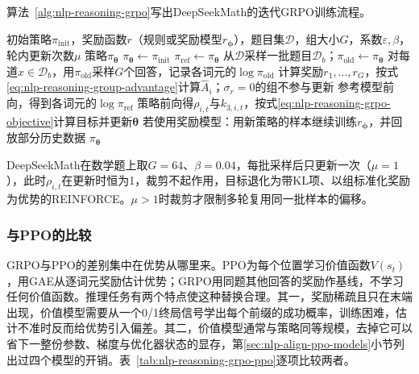 算法~\ref{alg:nlp-reasoning-grpo}写出DeepSeekMath的迭代GRPO训练流程。

\begin{algorithm}[迭代GRPO训练]
  \label{alg:nlp-reasoning-grpo}
  \begin{algorithmic}[1]
    \Require 初始策略$\pi_{\mathrm{init}}$，奖励函数$r$（规则或奖励模型$r_{\bm\phi}$），题目集$\mathcal D$，组大小$G$，系数$\varepsilon,\beta$，轮内更新次数$\mu$
    \Ensure 策略$\pi_{\bm\theta}$
    \State $\pi_{\bm\theta}\gets\pi_{\mathrm{init}}$
      \State $\pi_{\mathrm{ref}}\gets\pi_{\bm\theta}$ 
        \State 从$\mathcal D$采样一批题目$\mathcal D_b$；$\pi_{\mathrm{old}}\gets\pi_{\bm\theta}$
        \State 对每道$x\in\mathcal D_b$，用$\pi_{\mathrm{old}}$采样$G$个回答，记录各词元的$\log\pi_{\mathrm{old}}$
        \State 计算奖励$r_1,\ldots,r_G$，按式\eqref{eq:nlp-reasoning-group-advantage}计算$\widehat A_i$；$\sigma_r=0$的组不参与更新
        \State 参考模型前向，得到各词元的$\log\pi_{\mathrm{ref}}$
          \State 策略前向得$\rho_{i,t}$与$k_{3,i,t}$，按式\eqref{eq:nlp-reasoning-grpo-objective}计算目标并更新$\bm\theta$
        \EndFor
      \EndFor
      \State 若使用奖励模型：用新策略的样本继续训练$r_{\bm\phi}$，并回放部分历史数据
    \EndFor
    \State \Return $\pi_{\bm\theta}$
  \end{algorithmic}
\end{algorithm}

DeepSeekMath在数学题上取$G=64$、$\beta=0.04$，每批采样后只更新一次（$\mu=1$），此时$\rho_{i,t}$在更新时恒为1，裁剪不起作用，目标退化为带KL项、以组标准化奖励为优势的REINFORCE。$\mu>1$时裁剪才限制多轮复用同一批样本的偏移。

\subsubsection{与PPO的比较}
\label{sec:nlp-reasoning-grpo-ppo}

GRPO与PPO的差别集中在优势从哪里来。PPO为每个位置学习价值函数$V(s_t)$，用GAE从逐词元奖励估计优势；GRPO用同题其他回答的奖励作基线，不学习任何价值函数。推理任务有两个特点使这种替换合理。其一，奖励稀疏且只在末端出现，价值模型需要从一个0/1终局信号学出每个前缀的成功概率，训练困难，估计不准时反而给优势引入偏差。其二，价值模型通常与策略同等规模，去掉它可以省下一整份参数、梯度与优化器状态的显存，第\ref{sec:nlp-align-ppo-models}小节列出过四个模型的开销。表~\ref{tab:nlp-reasoning-grpo-ppo}逐项比较两者。

